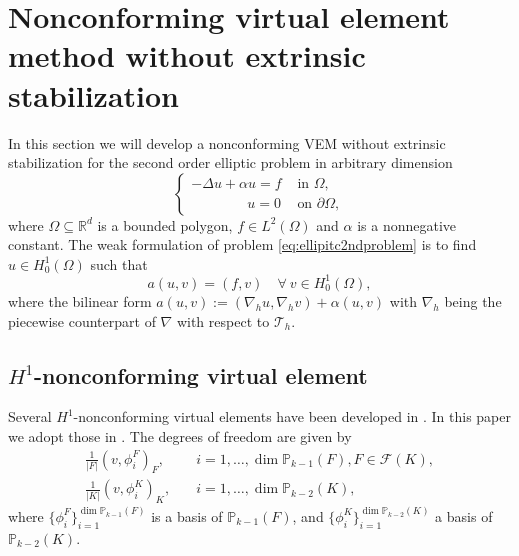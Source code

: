 \documentclass[10pt]{amsart}
\numberwithin{equation}{section}
\begin{document}
\section{Nonconforming virtual element method without extrinsic stabilization}\label{sec:stabfreencfmvem}


In this section we will develop a nonconforming VEM without extrinsic stabilization for the second order elliptic problem in arbitrary dimension
\begin{equation}\label{eq:ellipitc2ndproblem}
\begin{cases}
-\Delta u + \alpha u=f & \textrm{ in } \Omega,\\
\qquad\qquad u=0&\textrm{ on } \partial\Omega,
\end{cases}
\end{equation}
where $\Omega\subseteq\mathbb R^d$ is a bounded polygon, $f\in L^2(\Omega)$ and $\alpha$ is a nonnegative constant. The weak formulation of problem \eqref{eq:ellipitc2ndproblem} is to find $u\in H_0^1(\Omega)$ such that
\begin{equation}\label{eq:ellipitc2ndproblemweakform}
a(u,v)=(f,v)\quad\forall~v\in H_0^1(\Omega),
\end{equation}
where the bilinear form $a(u, v):=(\nabla_h u, \nabla_h v)+\alpha(u,v)$ with $\nabla_h$ being the piecewise counterpart of $\nabla$ with respect to $\mathcal T_h$.



\subsection{$H^1$-nonconforming virtual element}
Several $H^1$-nonconforming virtual elements have been developed in \cite{AyusodeDiosLipnikovManzini2016,CangianiManziniSutton2017,ChenHuang2020ncvem,Huang2020}.
In this paper we adopt those in \cite{CangianiManziniSutton2017,ChenHuang2020ncvem}.
The degrees of freedom are given by
\begin{align}
\frac{1}{|F|}(v, \phi_i^F)_F, & \quad i=1,\ldots, \dim\mathbb P_{k-1}(F), F\in\mathcal F(K), \label{eq:vemdof1}\\
\frac{1}{|K|}(v, \phi_i^K)_K, & \quad i=1,\ldots, \dim\mathbb P_{k-2}(K), \label{eq:vemdof2}
\end{align}
where $\{\phi_i^F\}_{i=1}^{\dim\mathbb P_{k-1}(F)}$ is a basis of $\mathbb P_{k-1}(F)$, and $\{\phi_i^K\}_{i=1}^{\dim\mathbb P_{k-2}(K)}$ a basis of $\mathbb P_{k-2}(K)$.
\end{document}
